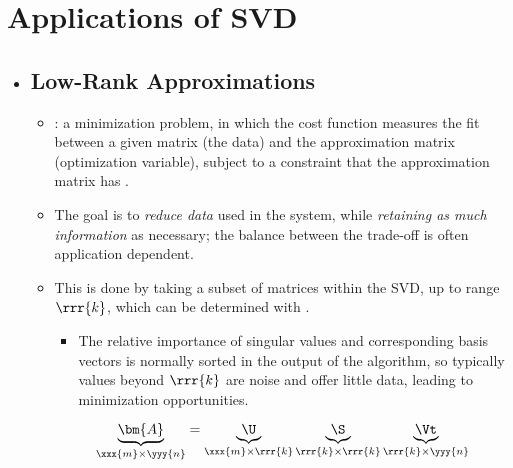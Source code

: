 \section{Applications of SVD}\label{Applications of SVD}
\begin{itemize}
  \item []
  
  \subsection{Low-Rank Approximations}\label{Low Rank Approximations}
  \begin{itemize}
    \item {}: a minimization problem, in which the cost function measures the fit between a given matrix (the data) and the approximation matrix (optimization variable), subject to a constraint that the approximation matrix has \hyperref[Matrix Rank]{}.
    \item The goal is to \emph{reduce data} used in the system, while \emph{retaining as much information} as necessary; the balance between the trade-off is often application dependent.
    \item This is done by taking a subset of matrices within the SVD, up to range \(\rrr{k}\), which can be determined with \hyperref[Percent Variance]{}.
    \begin{itemize}
      \item The relative importance of singular values and corresponding basis vectors is normally sorted in the output of the algorithm, so typically values beyond \(\rrr{k}\) are noise and offer little data, leading to minimization opportunities.
    \end{itemize} 
    \[%
    \underbrace{\bm{A}}_{\xxx{m} \times \yyy{n}} = \underbrace{\U}_{\xxx{m} \times \rrr{k}} \underbrace{\S}_{\rrr{k} \times \rrr{k}} \underbrace{\Vt}_{\rrr{k} \times \yyy{n}}
    \]%
    
  \end{itemize}


\end{itemize}
